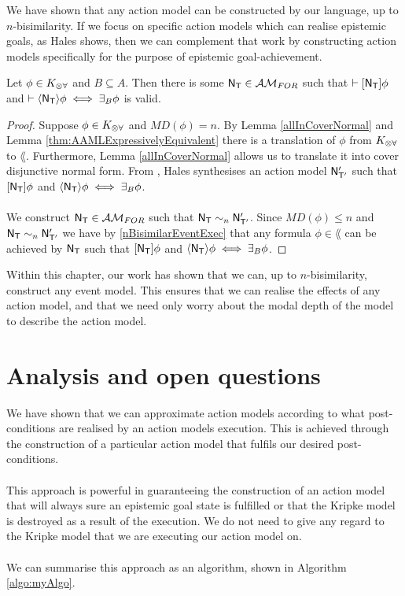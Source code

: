 We have shown that any action model can be constructed by our language, up to $n$-bisimilarity.
If we focus on specific action models which can realise epistemic goals, as Hales
\cite{hales13synthesis} shows, then we can complement that work by constructing action models
specifically for the purpose of epistemic goal-achievement.

\begin{corr} \label{approximatingBRestricted}
Let $\phi \in K_{\otimes\forall}$ and $B \subseteq A$.
Then there is some $\mathrm{\mathsf{N}}_\mathrm{\mathsf{T}} \in \mathcal{AM}_{FOR}$ such that $\vdash [{\mathrm{\mathsf{N}}_\mathrm{\mathsf{T}}}] \phi$ and
$\vdash \langle { \ensuremath {\mathrm{\mathsf{N}}} _ \ensuremath {\mathrm{\mathsf{T}}} } \rangle \phi \iff \exists_B \phi$ is valid.
\end{corr}

\begin{proof}
Suppose $\phi \in K_{\otimes\forall}$ and $MD(\phi) = n$.
By Lemma \ref{allInCoverNormal} and Lemma \ref{thm:AAMLExpressivelyEquivalent} there is a translation of $\phi$ from $K_{\otimes\forall}$ to $\lang$.
Furthermore, Lemma \ref{allInCoverNormal} allows us to translate it into cover disjunctive normal form.
From \cite{hales13synthesis}, Hales synthesises an action model $\mathrm{\mathsf{N}}'_{\mathrm{\mathsf{T}}'}$ such that $[{\mathrm{\mathsf{N}}_\mathrm{\mathsf{T}}}] \phi$ and $\langle { \ensuremath {\mathrm{\mathsf{N}}} _ \ensuremath {\mathrm{\mathsf{T}}} } \rangle
\phi \iff \exists_B \phi$.\\
\\
We construct $\mathrm{\mathsf{N}}_\mathrm{\mathsf{T}} \in \mathcal{AM}_{FOR}$ such that $\mathrm{\mathsf{N}}_\mathrm{\mathsf{T}} \sim_n \mathrm{\mathsf{N}}'_{\mathrm{\mathsf{T}}'}$.
Since $MD(\phi) \leq n$ and $\mathrm{\mathsf{N}}_\mathrm{\mathsf{T}} \sim_n \mathrm{\mathsf{N}}'_{\mathrm{\mathsf{T}}'}$ we have by \ref{nBisimilarEventExec} that any
formula $\phi \in \lang$ can be achieved by $\mathrm{\mathsf{N}}_\mathrm{\mathsf{T}}$ such that $[{\mathrm{\mathsf{N}}_\mathrm{\mathsf{T}}}] \phi$ and $\langle { \ensuremath {\mathrm{\mathsf{N}}} _ \ensuremath {\mathrm{\mathsf{T}}} } \rangle \phi
\iff \exists_B \phi$.
\end{proof}

Within this chapter, our work has shown that we can, up to $n$-bisimilarity, construct any event
model.
This ensures that we can realise the effects of any action model, and that we need only worry about
the modal depth of the model to describe the action model.

\section{Analysis and open questions} \label{subsec:multi:sequentCalc}

We have shown that we can approximate action models according to what
post-conditions are realised by an action models execution.
This is achieved through the construction of a particular action model that fulfils
our desired post-conditions.\\
\\
This approach is powerful in guaranteeing the construction of an action model
that will always sure an epistemic goal state is fulfilled or that the Kripke
model is destroyed as a result of the execution.
We do not need to give any regard to the Kripke model that we are executing our
action model on.\\
\\
We can summarise this approach as an algorithm, shown in Algorithm \ref{algo:myAlgo}.

